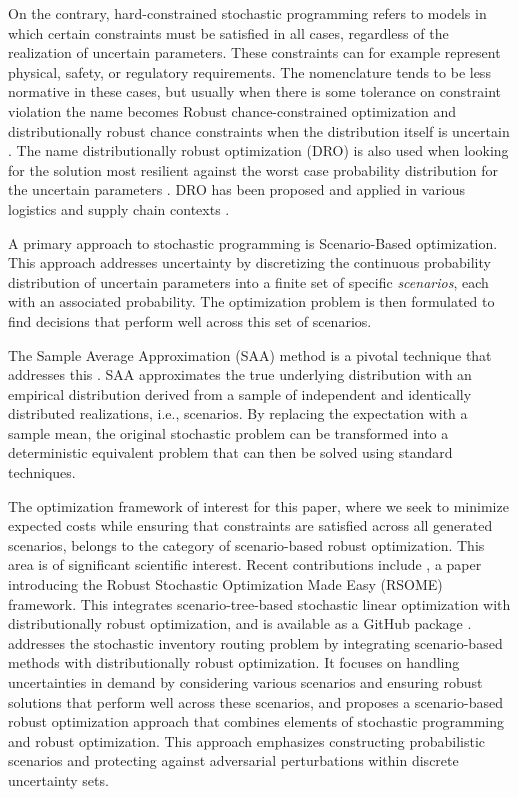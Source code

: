 \documentclass[preprint,11pt,authoryear]{elsarticle}
\begin{document}
On the contrary, hard-constrained stochastic programming \cite{BL11,SDR09} refers to models in which certain constraints must be satisfied in all cases, regardless of the realization of uncertain parameters. These constraints can for example represent physical, safety, or regulatory requirements. The nomenclature tends to be less normative in these cases, but usually when there is some tolerance on constraint violation the name becomes Robust chance-constrained optimization \cite{RM22} and distributionally robust chance constraints when the distribution itself is uncertain \cite{DY10,RM22}. The name distributionally robust optimization (DRO) is also used when looking for the solution most resilient against the worst case probability distribution for the uncertain parameters \cite{DY10}. DRO has been proposed and applied in various logistics and supply chain contexts \cite{WC20,JWCZ22}.

A primary approach to stochastic programming is Scenario-Based optimization. This approach addresses uncertainty by discretizing the continuous probability distribution of uncertain parameters into a finite set of specific {\it scenarios}, each with an associated probability. The optimization problem is then formulated to find decisions that perform well across this set of scenarios.

The Sample Average Approximation (SAA) method is a pivotal technique that addresses this \cite{SH98}. SAA approximates the true underlying distribution with an empirical distribution derived from a sample of independent and identically distributed realizations, i.e., scenarios. By replacing the expectation with a sample mean, the original stochastic problem can be transformed into a deterministic equivalent problem that can then be solved using standard techniques.

The optimization framework of interest for this paper, where we seek to minimize expected costs while ensuring that constraints are satisfied across all generated scenarios, belongs to the category of scenario-based robust optimization. This area is of significant scientific interest. Recent contributions include \cite{CSX20}, a paper introducing the Robust Stochastic Optimization Made Easy (RSOME) framework. This integrates scenario-tree-based stochastic linear optimization with distributionally robust optimization, and is available as a GitHub package \cite{CX23}. \cite{LCKZ23} addresses the stochastic inventory routing problem by integrating scenario-based methods with distributionally robust optimization. It focuses on handling uncertainties in demand by considering various scenarios and ensuring robust solutions that perform well across these scenarios, and \cite{WAJ23} proposes a scenario-based robust optimization approach that combines elements of stochastic programming and robust optimization. This approach emphasizes constructing probabilistic scenarios and protecting against adversarial perturbations within discrete uncertainty sets.
\end{document}
